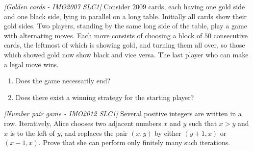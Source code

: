 \begin{problem}
\textit{[Golden cards - IMO2007 SLC1]}
Consider $2009$ cards, each having one gold side and one black side, lying in parallel on a long table. Initially all cards show their gold sides. Two players, standing by the same long side of the table, play a game with alternating moves. Each move consists of choosing a block of $50$ consecutive cards, the leftmost of which is showing gold, and turning them all over, so those which showed gold now show black and vice versa. The last player who can make a legal move wins.
\begin{enumerate}
\item Does the game necessarily end?
\item Does there exist a winning strategy for the starting player?
\end{enumerate}
\end{problem}
%

\begin{problem}
\textit{[Number pair game - IMO2012 SLC1]}
Several positive integers are written in a row. Iteratively, Alice chooses two adjacent numbers $x$ and $y$ such that $x > y$ and $x$ is to the left of $y$, and replaces the pair $(x, y)$ by either $(y + 1, x)$ or $(x − 1, x)$. Prove that she can perform only ﬁnitely many such iterations.
\end{problem}
%



